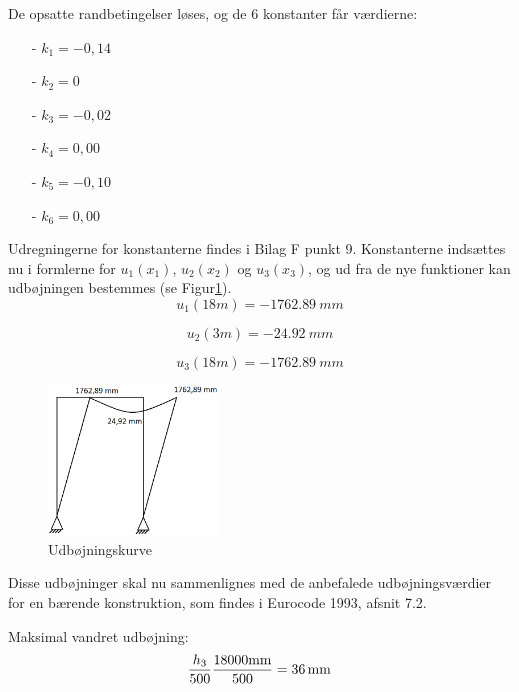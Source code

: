 De opsatte randbetingelser løses, og de 6 konstanter får værdierne: 
\begin{itemize}
	\item[-] $k_1 = -0,\!14$
	\item[-] $k_2 = 0$
	\item[-] $k_3 = -0,\!02$
	\item[-] $k_4 = 0,\!00$
	\item[-] $k_5 = -0,\!10$
	\item[-] $k_6 = 0,\!00$
\end{itemize}

Udregningerne for konstanterne findes i Bilag F punkt 9.
\newline
\newline 
Konstanterne indsættes nu i formlerne for $u_1(x_1)$, $u_2(x_2)$ og $u_3(x_3)$, og ud fra de nye funktioner kan udbøjningen bestemmes (se Figur\ref{fig:udboj}).
\begin{equation}
u_1(18m) = \SI{-1762,89}{mm}
\end{equation}

\begin{equation}
u_2(3m) = \SI{-24,92}{mm}
\end{equation}

\begin{equation}
u_3(18m) = \SI{-1762,89}{mm}
\end{equation}

\begin{figure}[H]
	\centering
	\includegraphics[width=0.4\textwidth]{billeder/udbog.png}
	\caption{Udbøjningskurve}
	\label{fig:udboj}
\end{figure}

Disse udbøjninger skal nu sammenlignes med de anbefalede udbøjningsværdier for en bærende konstruktion, som findes i Eurocode 1993, afsnit 7.2. 

Maksimal vandret udbøjning: 
\begin{equation}
\frac{h_3}{500}
\\
\frac{18000 \text{mm}}{500} = \SI{36}{mm}
\end{equation}

